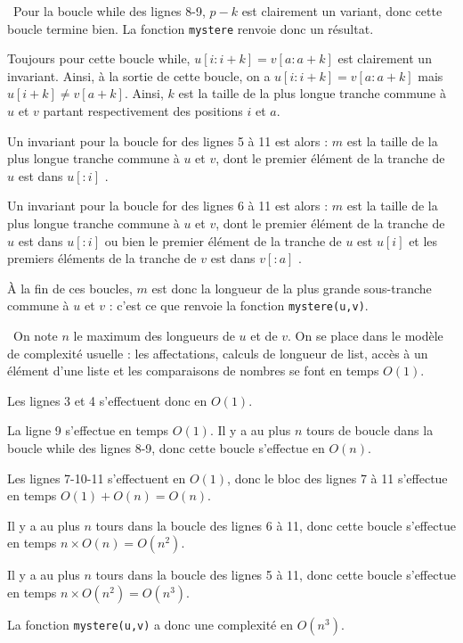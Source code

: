 \exer{}
\setcounter{numques}{0}

\question\ Pour la boucle while des lignes 8-9, $p-k$ est clairement un variant, donc cette boucle termine bien. La fonction \texttt{mystere} renvoie donc un résultat. 

  Toujours pour cette boucle while, \og $u[i:i+k] = v[a:a+k]$ \fg{} est clairement un invariant. Ainsi, à la sortie de cette boucle, on a $u[i:i+k] = v[a:a+k]$ mais $u[i+k] \neq v[a+k]$. 
  Ainsi, $k$ est la taille de la plus longue tranche commune à $u$ et $v$ partant respectivement des positions $i$ et $a$. 
  
  Un invariant pour la boucle for des lignes 5 à 11 est alors : \og $m$ est la taille de la plus longue tranche commune à $u$ et $v$, dont le premier élément de la tranche de $u$ est dans $u[:i]$ \fg. 
  
  Un invariant pour la boucle for des lignes 6 à 11 est alors : \og $m$ est la taille de la plus longue tranche commune à $u$ et $v$, dont le premier élément de la tranche de $u$ est dans $u[:i]$ ou bien le premier élément de la tranche de $u$ est $u[i]$ et les premiers éléments de la tranche de $v$ est dans $v[:a]$ \fg. 
  
  À la fin de ces boucles, $m$ est donc la longueur de la plus grande sous-tranche commune à $u$ et $v$ : c'est ce que renvoie la fonction \texttt{mystere(u,v)}. 
  
\question\ On note $n$ le maximum des longueurs de $u$ et de $v$. 
  On se place dans le modèle de complexité usuelle : les affectations, calculs de longueur de list, accès à un élément d'une liste et les comparaisons de nombres se font en temps $O(1)$.
  
  Les lignes 3 et 4 s'effectuent donc en $O(1)$.
  
  La ligne 9 s'effectue en temps $O(1)$. Il y a au plus $n$ tours de boucle dans la boucle while des lignes 8-9, donc cette boucle s'effectue en $O(n)$. 
  
  Les lignes 7-10-11 s'effectuent en $O(1)$, donc le bloc des lignes 7 à 11 s'effectue en temps $O(1) + O(n) = O(n)$. 
  
  Il y a au plus $n$ tours dans la boucle des lignes 6 à 11, donc cette boucle s'effectue en temps $n \times O(n) = O(n^2)$. 
  
  Il y a au plus $n$ tours dans la boucle des lignes 5 à 11, donc cette boucle s'effectue en temps $n \times O(n^2) = O(n^3)$.
  
  La fonction \texttt{mystere(u,v)} a donc une complexité en $O(n^3)$.